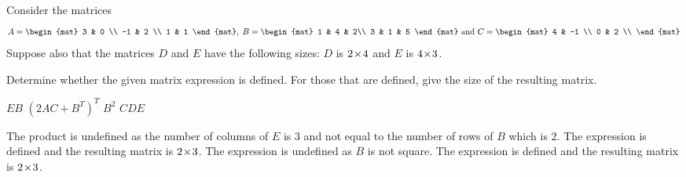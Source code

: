 

\begin{Exercise}[
name={},
title={}, 
difficulty=0,
origin={\cite{MB}}]
Consider the matrices
$$
A = 
\begin{mat}
  3 & 0 \\
  -1 & 2 \\
  1  & 1
\end{mat}, \; B=
\begin{mat}
  1 & 4 & 2\\
  3 & 1 & 5
\end{mat} \text{ and }  C=
\begin{mat}
  4 & -1 \\
  0 & 2 \\
\end{mat}
$$
Suppose also that the matrices $D$ and $E$ have the following sizes: 
$D$ is $2 \! \times \! 4$  and $E$ is $4 \! \times \! 3$.

Determine whether the given matrix expression is defined. For those that are defined, give the size of the resulting matrix. 
\begin{multicols}{3}
\Question $EB$ 
\Question $(2AC+B^T)^T$ 
\Question $B^2$
\Question $CDE$
\EndCurrentQuestion
\end{multicols}

\end{Exercise}

\begin{Answer}
\Question The product is undefined as the number of columns of $E$ is $3$ and not equal to the number of rows of $B$ which is $2$.
\Question The expression is defined and the resulting matrix is $2 \! \times \! 3$.
\Question The expression is undefined as $B$ is not square.
\Question The expression is defined and the resulting matrix is $2 \! \times \! 3$.
\end{Answer}
